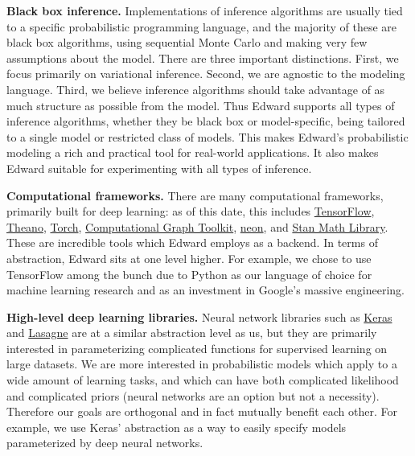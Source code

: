 \textbf{Black box inference.}
Implementations of inference algorithms are usually tied to a specific
probabilistic programming language, and the majority of these are
black box algorithms, using sequential Monte Carlo and making very few
assumptions about the model. There are three important distinctions.
First, we focus primarily on variational inference. Second, we are
agnostic to the modeling language. Third, we believe inference
algorithms should take advantage of as much structure as possible from
the model. Thus Edward supports all types of inference algorithms,
whether they be black box or model-specific, being tailored to a
single model or restricted class of models.  This makes Edward's
probabilistic modeling a rich and practical tool for real-world
applications. It also makes Edward suitable for experimenting with
all types of inference.

\textbf{Computational frameworks.}
There are many computational frameworks, primarily built for deep
learning: as of this date, this includes
\href{https://www.tensorflow.org}{TensorFlow},
\href{http://deeplearning.net/software/theano/}{Theano},
\href{http://torch.ch}{Torch},
\href{http://rll.berkeley.edu/cgt/}{Computational Graph Toolkit},
\href{https://github.com/NervanaSystems/neon}{neon}, and
\href{https://github.com/stan-dev/math}{Stan Math Library}. These are
incredible tools which Edward employs as a backend. In
terms of abstraction, Edward sits at one level higher. For example,
we chose to use TensorFlow among the bunch due to Python as our language
of choice for machine learning research and as an investment in Google's
massive engineering.

\textbf{High-level deep learning libraries.}
Neural network libraries such as
\href{https://github.com/fchollet/keras}{Keras} and
\href{https://github.com/Lasagne/Lasagne}{Lasagne} are at a similar
abstraction level as us, but they are primarily interested in
parameterizing complicated functions for supervised learning on large
datasets. We are more interested in probabilistic models which apply
to a wide amount of learning tasks, and which can have both
complicated likelihood and complicated priors (neural networks are an
option but not a necessity). Therefore our goals are orthogonal and in
fact mutually benefit each other. For example, we use Keras'
abstraction as a way to easily specify models parameterized by deep
neural networks.
